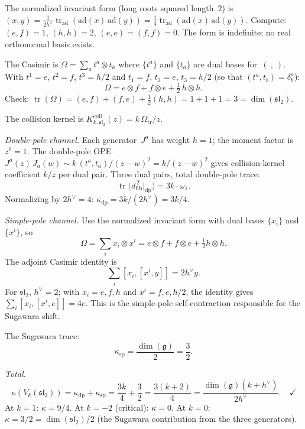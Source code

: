 \documentclass[11pt,reqno]{amsart}
\theoremstyle{definition}
\theoremstyle{remark}
\newcommand{\fg}{\mathfrak{g}}
\newcommand{\dfib}{d_{\mathrm{fib}}}
\DeclareMathOperator{\tr}{tr}
\numberwithin{equation}{section}
\begin{document}
The normalized invariant form (long roots squared
length~$2$) is $(x,y) = \frac{1}{2h^\vee}\tr_{\mathrm{ad}}
(\mathrm{ad}(x)\,\mathrm{ad}(y))
= \frac{1}{4}\tr_{\mathrm{ad}}
(\mathrm{ad}(x)\,\mathrm{ad}(y))$.
Compute: $(e,f) = 1$, $(h,h) = 2$, $(e,e) = (f,f) = 0$.
The form is indefinite; no real orthonormal basis exists.

The Casimir is $\Omega = \sum_a t^a \otimes t_a$ where
$\{t^a\}$ and $\{t_a\}$ are dual bases for~$(\ ,\ )$.
With $t^1 = e$, $t^2 = f$, $t^3 = h/2$ and
$t_1 = f$, $t_2 = e$, $t_3 = h/2$
(so that $(t^a, t_b) = \delta^a_b$):
\begin{equation}\label{eq:sl2-casimir}
\Omega = e \otimes f + f \otimes e
+ \tfrac{1}{2}\,h \otimes h.
\end{equation}
Check: $\tr(\Omega) = (e,f) + (f,e) + \frac{1}{2}(h,h)
= 1 + 1 + 1 = 3 = \dim(\mathfrak{sl}_2)$.

The collision kernel is
$K_{k,\mathfrak{sl}_2}^{\mathrm{coll}}(z)
=k\,\Omega_{\mathrm{tr}}/z$.

\medskip\noindent
\emph{Double-pole channel.}
Each generator~$J^a$ has weight $h = 1$; the moment factor is
$z^0 = 1$. The double-pole OPE
$J^a(z)\,J_a(w) \sim k\,(t^a,t_a)/(z-w)^2 = k/(z-w)^2$
gives collision-kernel coefficient $k/z$ per dual pair. Three dual pairs,
total double-pole trace:
\[
\tr\bigl(\dfib^{\,2}\big|_{\mathrm{dp}}\bigr)
= 3k\cdot\omega_1.
\]
Normalizing by $2h^\vee = 4$:
$\kappa_{\mathrm{dp}} = 3k/(2h^\vee) = 3k/4$.

\medskip\noindent
\emph{Simple-pole channel.}
Use the normalized invariant form with dual bases
$\{x_i\}$ and $\{x^i\}$, so
\[
\Omega=\sum_i x_i\otimes x^i
=e\otimes f+f\otimes e+\tfrac12h\otimes h .
\]
The adjoint Casimir identity is
\[
\sum_i[x_i,[x^i,y]]=2h^\vee y .
\]
For $\mathfrak{sl}_2$, $h^\vee=2$; with
$x_i=e,f,h$ and $x^i=f,e,h/2$, the identity gives
$\sum_i[x_i,[x^i,e]]=4e$. This is the simple-pole
self-contraction responsible for the Sugawara shift.

The Sugawara trace:
\[
\kappa_{\mathrm{sp}} = \frac{\dim(\fg)}{2} = \frac{3}{2}.
\]

\medskip\noindent
\emph{Total.}
\[
\kappa(V_k(\mathfrak{sl}_2))
= \kappa_{\mathrm{dp}} + \kappa_{\mathrm{sp}}
= \frac{3k}{4} + \frac{3}{2}
= \frac{3(k+2)}{4}
= \frac{\dim(\fg)(k+h^\vee)}{2h^\vee}.\quad\checkmark
\]
At $k = 1$: $\kappa = 9/4$. At $k = -2$ (critical):
$\kappa = 0$. At $k = 0$:
$\kappa = 3/2 = \dim(\mathfrak{sl}_2)/2$
(the Sugawara contribution from the three generators).
\end{document}
